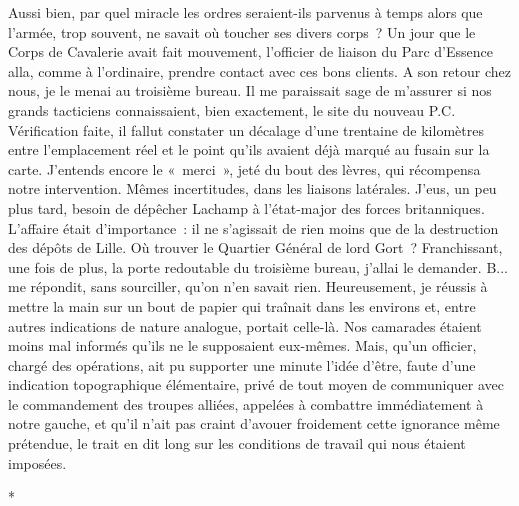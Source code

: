 \documentclass[french,twoside]{book} %
\begin{document}
Aussi bien, par quel miracle les ordres seraient-ils   parvenus à temps alors que l’armée, trop souvent, ne savait où toucher ses divers corps ? Un jour que le Corps de Cavalerie avait fait mouvement, l’officier de liaison du Parc d’Essence alla, comme à l’ordinaire, prendre contact avec ces bons clients. A son retour chez nous, je le menai au troisième bureau. Il me paraissait sage de m’assurer si nos grands tacticiens connaissaient, bien exactement, le site du nouveau P.C. Vérification faite, il fallut constater un décalage d’une trentaine de kilomètres entre l’emplacement réel et le point qu’ils avaient déjà marqué au fusain sur la carte. J’entends encore le « merci », jeté du bout des lèvres, qui récompensa notre intervention. Mêmes incertitudes, dans les liaisons latérales. J’eus, un peu plus tard, besoin de dépêcher Lachamp à l’état-major des forces britanniques. L’affaire était d’importance : il ne s’agissait de rien moins que de la destruction des dépôts de Lille. Où trouver le Quartier Général de lord Gort ? Franchissant, une fois de plus, la porte redoutable du troisième bureau, j’allai le demander. B... me répondit, sans sourciller, qu’on n’en savait rien. Heureusement, je réussis à mettre la main sur un bout de papier qui traînait dans les environs et, entre autres indications de nature analogue, portait celle-là. Nos camarades étaient moins mal informés qu’ils ne le supposaient eux-mêmes. Mais, qu’un officier, chargé des opérations, ait pu supporter une minute l’idée d’être, faute d’une indication topographique élémentaire, privé de tout moyen de communiquer avec le commandement des troupes alliées, appelées à combattre immédiatement à notre gauche, et qu’il n’ait pas craint d’avouer froidement cette ignorance même prétendue, le trait en dit long sur les conditions de travail qui nous étaient imposées.\par

\begin{center}
\noindent \centerline{*}\par
\end{center}
\end{document}
